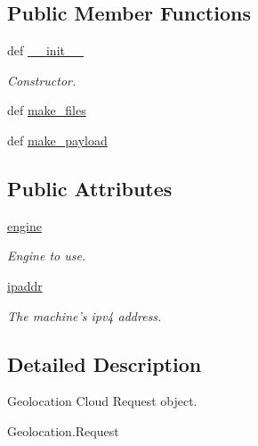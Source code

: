 \subsection*{Public Member Functions}
\begin{DoxyCompactItemize}
\item 
def \hyperlink{classRappCloud_1_1CloudMsgs_1_1Geolocation_1_1Geolocation_1_1Request_a4d5f6c7355367ab1f4e610ca04f51047}{\-\_\-\-\_\-init\-\_\-\-\_\-}
\begin{DoxyCompactList}\small\item\em Constructor. \end{DoxyCompactList}\item 
def \hyperlink{classRappCloud_1_1CloudMsgs_1_1Geolocation_1_1Geolocation_1_1Request_a35e98f5238e3df57d667d5631d4952e0}{make\-\_\-files}
\item 
def \hyperlink{classRappCloud_1_1CloudMsgs_1_1Geolocation_1_1Geolocation_1_1Request_afb5b3cf1b371919b3c10110de027b9b6}{make\-\_\-payload}
\end{DoxyCompactItemize}
\subsection*{Public Attributes}
\begin{DoxyCompactItemize}
\item 
\hyperlink{classRappCloud_1_1CloudMsgs_1_1Geolocation_1_1Geolocation_1_1Request_a2c418195f54a0e64f987b2404b592644}{engine}
\begin{DoxyCompactList}\small\item\em Engine to use. \end{DoxyCompactList}\item 
\hyperlink{classRappCloud_1_1CloudMsgs_1_1Geolocation_1_1Geolocation_1_1Request_a1da80c2b468e59f96d6cfa8bb06e95d3}{ipaddr}
\begin{DoxyCompactList}\small\item\em The machine's ipv4 address. \end{DoxyCompactList}\end{DoxyCompactItemize}


\subsection{Detailed Description}
\begin{DoxyVerb}Geolocation Cloud Request object.

Geolocation.Request
\end{DoxyVerb}
 

